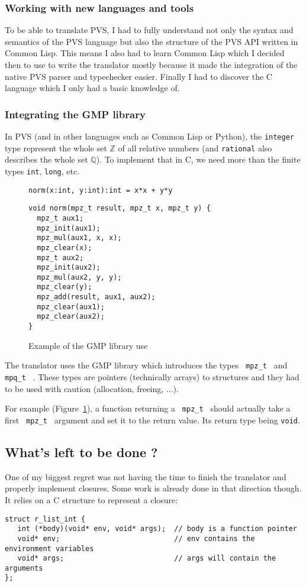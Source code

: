 \documentclass[12pt,a4paper]{article}
\newcommand{\cl}[1]{\texttt{#1}}
\newcommand{\Z}{\mathbb{Z}}
\newcommand{\Q}{\mathbb{Q}}
\newcommand{\mpzt}{ \texttt{ mpz\_t } }
\newcommand{\mpqt}{ \texttt{ mpq\_t } }
\begin{document}
\subsubsection*{Working with new languages and tools}

To be able to translate PVS, I had to fully understand not only the syntax and semantics of the PVS language but also the structure of the PVS API written in Common Lisp. This means I also had to learn Common Lisp which I decided then to use to write the translator mostly because it made the integration of the native PVS parser and typechecker easier. Finally I had to discover the C language which I only had a basic knowledge of.


\subsubsection*{Integrating the GMP library}
In PVS (and in other languages such as Common Lisp or Python), the \cl{integer} type represent the whole set $\Z$ of all relative numbers (and \cl{rational} also describes the whole set $\Q$).
To implement that in C, we need more than the finite types \cl{int}, \cl{long}, etc.

\begin{figure}[!ht]
\cl{norm(x:int, y:int):int = x*x + y*y}
\begin{lstlisting}
void norm(mpz_t result, mpz_t x, mpz_t y) {
  mpz_t aux1;
  mpz_init(aux1);
  mpz_mul(aux1, x, x);
  mpz_clear(x);
  mpz_t aux2;
  mpz_init(aux2);
  mpz_mul(aux2, y, y);
  mpz_clear(y);
  mpz_add(result, aux1, aux2);
  mpz_clear(aux1);
  mpz_clear(aux2);
}
\end{lstlisting}
\caption{Example of the GMP library use}
\label{fig:exGMP}
\end{figure}

The translator uses the GMP library which introduces the types \mpzt and \mpqt. These types are pointers (technically arrays) to structures and they had to be used with caution (allocation, freeing, ...).

For example (Figure~\ref{fig:exGMP}), a function returning a \mpzt should actually take a first \mpzt argument and set it to the return value. Its return type being \cl{void}.


\subsection{What's left to be done ?}

One of my biggest regret was not having the time to finish the translator and properly implement closures. Some work is already done in that direction though. It relies on a C structure to represent a closure:
\begin{lstlisting}
struct r_list_int {
   int (*body)(void* env, void* args);  // body is a function pointer
   void* env;                           // env contains the environment variables
   void* args;                          // args will contain the arguments
};
\end{lstlisting}
\end{document}
